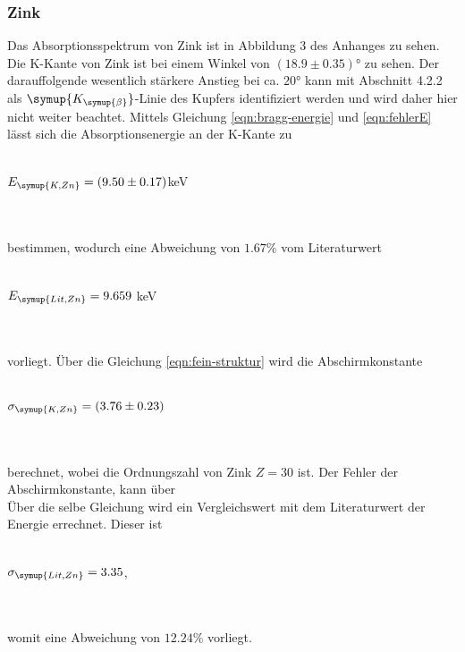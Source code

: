         \subsubsection{Zink}
            Das Absorptionsspektrum von Zink ist in Abbildung 3 des Anhanges zu sehen.
            Die K-Kante von Zink ist bei einem Winkel von $(18.9 \pm 0.35)°$ zu sehen. Der darauffolgende
            wesentlich stärkere Anstieg bei ca. $20°$ kann mit Abschnitt 4.2.2 als 
            $\symup{K_{\symup{\beta}}}$-Linie des Kupfers identifiziert werden und wird
            daher hier nicht weiter beachtet. Mittels Gleichung \eqref{eqn:bragg-energie} und \eqref{eqn:fehlerE} lässt sich
            die Absorptionsenergie an der K-Kante zu 
            \\ \\
            \centerline{$E_{\symup{K, Zn}} = (9.50 \pm 0.17)$keV}
            \\ \\
            bestimmen, wodurch eine Abweichung von $1.67 \%$ vom Literaturwert
            \\ \\
            \centerline{$E_{\symup{Lit, Zn}} = 9.659$ keV \cite{periodic}}
            \\ \\
            vorliegt. Über die Gleichung \eqref{eqn:fein-struktur} wird die Abschirmkonstante 
            \\ \\
            \centerline{$\sigma_{\symup{K, Zn}} = (3.76 \pm 0.23)$}
            \\ \\
            berechnet, wobei die Ordnungszahl von Zink $Z = 30$ ist.
            Der Fehler der Abschirmkonstante, kann über 
            \begin{equation}
            \label{eqn:fehlerA}

            \end{equation}
            Über die selbe Gleichung wird ein Vergleichswert mit dem Literaturwert der Energie 
            errechnet. Dieser ist
            \\ \\
            \centerline{$\sigma_{\symup{Lit, Zn}} = 3.35$,}
            \\ \\
            womit eine Abweichung von $12.24 \%$ vorliegt.

